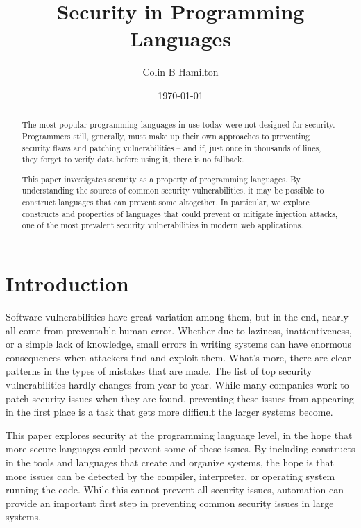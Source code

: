 \documentclass[twocolumn]{article}
\begin{document}
\title{Security in Programming Languages}
\author{Colin B Hamilton}
\date{\today}
\maketitle

\begin{abstract}
The most popular programming languages in use today were not designed for security.  Programmers still, generally, must make up their own approaches to preventing security flaws and patching vulnerabilities – and if, just once in thousands of lines, they forget to verify data before using it, there is no fallback.

This paper investigates security as a property of programming languages.  By understanding the sources of common security vulnerabilities, it may be possible to construct languages that can prevent some altogether.  In particular, we explore constructs and properties of languages that could prevent or mitigate injection attacks, one of the most prevalent security vulnerabilities in modern web applications.
\end{abstract}


\section{Introduction}
Software vulnerabilities have great variation among them, but in the end, nearly all come from preventable human error.  Whether due to laziness, inattentiveness, or a simple lack of knowledge, small errors in writing systems can have enormous consequences when attackers find and exploit them.  What's more, there are clear patterns in the types of mistakes that are made.  The list of top security vulnerabilities hardly changes from year to year.  While many companies work to patch security issues when they are found, preventing these issues from appearing in the first place is a task that gets more difficult the larger systems become.

This paper explores security at the programming language level, in the hope that more secure languages could prevent some of these issues.  By including constructs in the tools and languages that create and organize systems, the hope is that more issues can be detected by the compiler, interpreter, or operating system running the code.  While this cannot prevent all security issues, automation can provide an important first step in preventing common security issues in large systems.
\end{document}
